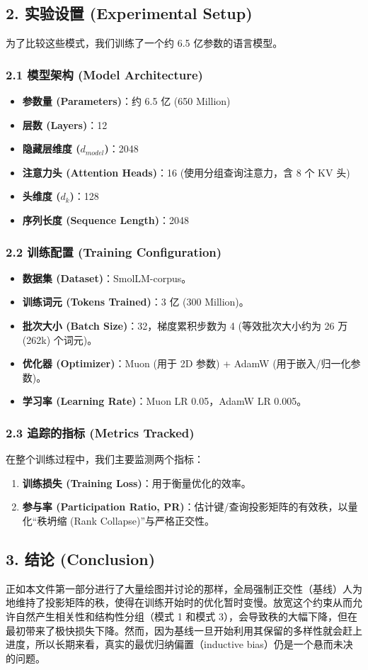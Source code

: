\documentclass[12pt]{article}
\begin{document}
\vspace{1em}

\subsection*{2. 实验设置 (Experimental Setup)}

为了比较这些模式，我们训练了一个约 6.5 亿参数的语言模型。

\subsubsection*{2.1 模型架构 (Model Architecture)}
\begin{itemize}
    \item \textbf{参数量 (Parameters)}：约 6.5 亿 (650 Million)
    \item \textbf{层数 (Layers)}：12
    \item \textbf{隐藏层维度 ($d_{model}$)}：2048
    \item \textbf{注意力头 (Attention Heads)}：16 (使用分组查询注意力，含 8 个 KV 头)
    \item \textbf{头维度 ($d_k$)}：128
    \item \textbf{序列长度 (Sequence Length)}：2048
\end{itemize}

\subsubsection*{2.2 训练配置 (Training Configuration)}
\begin{itemize}
    \item \textbf{数据集 (Dataset)}：SmolLM-corpus。
    \item \textbf{训练词元 (Tokens Trained)}：3 亿 (300 Million)。
    \item \textbf{批次大小 (Batch Size)}：32，梯度累积步数为 4 (等效批次大小约为 26 万 (262k) 个词元)。
    \item \textbf{优化器 (Optimizer)}：Muon (用于 2D 参数) + AdamW (用于嵌入/归一化参数)。
    \item \textbf{学习率 (Learning Rate)}：Muon LR 0.05，AdamW LR 0.005。
\end{itemize}

\subsubsection*{2.3 追踪的指标 (Metrics Tracked)}
在整个训练过程中，我们主要监测两个指标：
\begin{enumerate}
    \item \textbf{训练损失 (Training Loss)}：用于衡量优化的效率。
    \item \textbf{参与率 (Participation Ratio, PR)}：估计键/查询投影矩阵的有效秩，以量化“秩坍缩 (Rank Collapse)”与严格正交性。
\end{enumerate}

\subsection*{3. 结论 (Conclusion)}

正如本文件第一部分进行了大量绘图并讨论的那样，全局强制正交性（基线）人为地维持了投影矩阵的秩，使得在训练开始时的优化暂时变慢。放宽这个约束从而允许自然产生相关性和结构性分组（模式 1 和模式 3），会导致秩的大幅下降，但在最初带来了极快损失下降。然而，因为基线一旦开始利用其保留的多样性就会赶上进度，所以长期来看，真实的最优归纳偏置（inductive bias）仍是一个悬而未决的问题。
\end{document}
